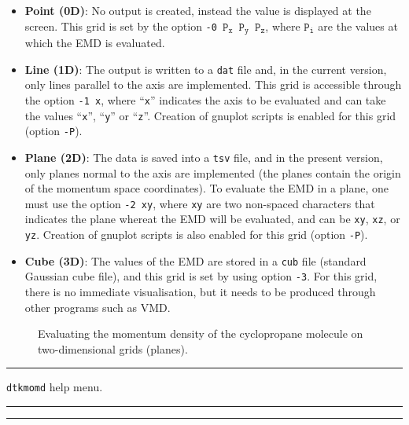 \begin{itemize}
   \item \textbf{Point (0D)}: No output is created, instead the value is displayed at the screen. This grid is set by the option \texttt{-0 $\mathtt{P}_\mathtt{x}$ $\mathtt{P}_\mathtt{y}$ $\mathtt{P}_\mathtt{z}$}, where \texttt{$\mathtt{P}_\mathtt{i}$} are the values at which the EMD is evaluated.
   \item \textbf{Line (1D)}: The output is written to a \texttt{dat} file and, in the current version, only lines parallel to the axis are implemented. This grid is accessible through the option \texttt{-1 x}, where ``\texttt{x}'' indicates the axis to be evaluated and can take the values ``\texttt{x}'', ``\texttt{y}'' or ``\texttt{z}''. Creation of gnuplot scripts is enabled for this grid (option \texttt{-P}).
   \item{\textbf{Plane (2D)}}: The data is saved into a \texttt{tsv} file, and in the present version, only planes normal to the axis are implemented (the planes contain the origin of the momentum space coordinates). To evaluate the EMD in a plane, one must use the option \texttt{-2 xy}, where \texttt{xy} are two non-spaced characters that indicates the plane whereat the EMD will be evaluated, and can be \texttt{xy}, \texttt{xz}, or \texttt{yz}. Creation of gnuplot scripts is also enabled for this grid (option \texttt{-P}).
   \item{\textbf{Cube (3D)}}: The values of the EMD are stored in a \texttt{cub} file (standard Gaussian cube file), and this grid is set by using option \texttt{-3}. For this grid, there is no immediate visualisation, but it needs to be produced through other programs such as VMD.
\end{itemize}
%
\begin{figure}[hb!]
\centering
{}\quad
{}
\caption{Evaluating the momentum density of the cyclopropane molecule on two-dimensional grids (planes).}\label{fig:dtkmomdusex}
\end{figure}
%

\rule{\textwidth}{1pt}
{\center\texttt{dtkmomd} help menu.\\}
\rule{\textwidth}{1pt}
\begin{footnotesize}
\end{footnotesize}
\rule{\textwidth}{1pt}



